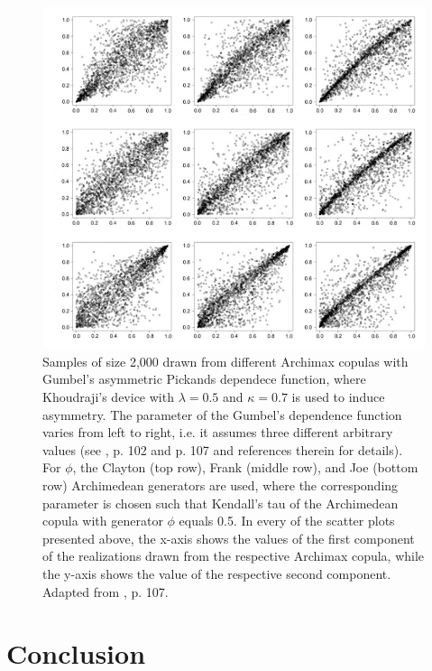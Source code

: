 \documentclass[
]{krantz}
\begin{document}
\begin{figure}

{\centering \includegraphics[width=0.7\linewidth]{./work/04-archimax/figures/Samples_Archimax_v02} 

}

\caption{Samples of size 2,000 drawn from different Archimax copulas with Gumbel's asymmetric Pickands dependece function, where Khoudraji's device with $\lambda = 0.5$ and $\kappa = 0.7$ is used to induce asymmetry. The parameter of the Gumbel's dependence function varies from left to right, i.e. it assumes three different arbitrary values (see \citet{genest2013}, p. 102 and p. 107 and references therein for details). For $\phi$, the Clayton (top row), Frank (middle row), and Joe (bottom row) Archimedean generators are used, where the corresponding parameter is chosen such that Kendall's tau of the Archimedean copula with generator $\phi$ equals 0.5. In every of the scatter plots presented above, the x-axis shows the values of the first component of the realizations drawn from the respective Archimax copula, while the y-axis shows the value of the respective second component. Adapted from \citet{genest2013}, p. 107.}\label{fig:archSmplsClaudia}
\end{figure}

\section{Conclusion}\label{concl}
\end{document}
